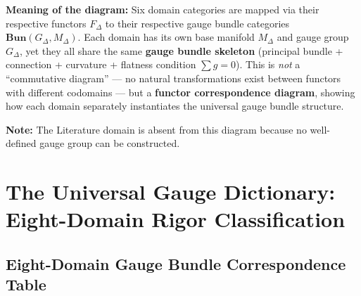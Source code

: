 \documentclass[12pt,a4paper]{article}
\theoremstyle{plain}
\theoremstyle{definition}
\newcommand{\BundleCat}{\mathbf{Bun}}
\begin{document}
\vspace{0.5cm}

\textbf{Meaning of the diagram:} Six domain categories are mapped via their respective functors $F_\Delta$ to their respective gauge bundle categories
$\BundleCat(G_\Delta, M_\Delta)$. Each domain has its own base manifold $M_\Delta$ and gauge group $G_\Delta$,
yet they all share the same \textbf{gauge bundle skeleton} (principal bundle + connection + curvature + flatness condition $\sum g = 0$).
This is \textit{not} a ``commutative diagram'' — no natural transformations exist between functors with different codomains — but a \textbf{functor correspondence diagram},
showing how each domain separately instantiates the universal gauge bundle structure.

\textbf{Note:} The Literature domain is absent from this diagram because no well-defined gauge group can be constructed.

\newpage


\section{The Universal Gauge Dictionary: Eight-Domain Rigor Classification}

\subsection{Eight-Domain Gauge Bundle Correspondence Table}
\end{document}

